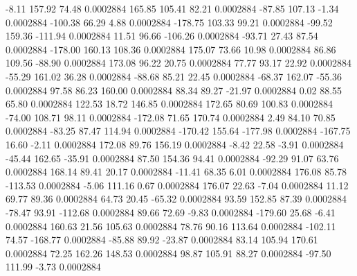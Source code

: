        -8.11      157.92       74.48     0.0002884
      165.85      105.41       82.21     0.0002884
      -87.85      107.13       -1.34     0.0002884
     -100.38       66.29        4.88     0.0002884
     -178.75      103.33       99.21     0.0002884
      -99.52      159.36     -111.94     0.0002884
       11.51       96.66     -106.26     0.0002884
      -93.71       27.43       87.54     0.0002884
     -178.00      160.13      108.36     0.0002884
      175.07       73.66       10.98     0.0002884
       86.86      109.56      -88.90     0.0002884
      173.08       96.22       20.75     0.0002884
       77.77       93.17       22.92     0.0002884
      -55.29      161.02       36.28     0.0002884
      -88.68       85.21       22.45     0.0002884
      -68.37      162.07      -55.36     0.0002884
       97.58       86.23      160.00     0.0002884
       88.34       89.27      -21.97     0.0002884
        0.02       88.55       65.80     0.0002884
      122.53       18.72      146.85     0.0002884
      172.65       80.69      100.83     0.0002884
      -74.00      108.71       98.11     0.0002884
     -172.08       71.65      170.74     0.0002884
        2.49       84.10       70.85     0.0002884
      -83.25       87.47      114.94     0.0002884
     -170.42      155.64     -177.98     0.0002884
     -167.75       16.60       -2.11     0.0002884
      172.08       89.76      156.19     0.0002884
       -8.42       22.58       -3.91     0.0002884
      -45.44      162.65      -35.91     0.0002884
       87.50      154.36       94.41     0.0002884
      -92.29       91.07       63.76     0.0002884
      168.14       89.41       20.17     0.0002884
      -11.41       68.35        6.01     0.0002884
      176.08       85.78     -113.53     0.0002884
       -5.06      111.16        0.67     0.0002884
      176.07       22.63       -7.04     0.0002884
       11.12       69.77       89.36     0.0002884
       64.73       20.45      -65.32     0.0002884
       93.59      152.85       87.39     0.0002884
      -78.47       93.91     -112.68     0.0002884
       89.66       72.69       -9.83     0.0002884
     -179.60       25.68       -6.41     0.0002884
      160.63       21.56      105.63     0.0002884
       78.76       90.16      113.64     0.0002884
     -102.11       74.57     -168.77     0.0002884
      -85.88       89.92      -23.87     0.0002884
       83.14      105.94      170.61     0.0002884
       72.25      162.26      148.53     0.0002884
       98.87      105.91       88.27     0.0002884
      -97.50      111.99       -3.73     0.0002884
